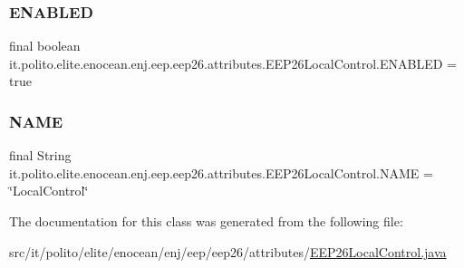 \subsubsection{\texorpdfstring{E\+N\+A\+B\+L\+ED}{ENABLED}}
{\footnotesize\ttfamily final boolean it.\+polito.\+elite.\+enocean.\+enj.\+eep.\+eep26.\+attributes.\+E\+E\+P26\+Local\+Control.\+E\+N\+A\+B\+L\+ED = true\hspace{0.3cm}{\ttfamily [static]}}

\hypertarget{classit_1_1polito_1_1elite_1_1enocean_1_1enj_1_1eep_1_1eep26_1_1attributes_1_1_e_e_p26_local_control_ae2c0ca54768891dbc547ebeb893e53b3}{}\label{classit_1_1polito_1_1elite_1_1enocean_1_1enj_1_1eep_1_1eep26_1_1attributes_1_1_e_e_p26_local_control_ae2c0ca54768891dbc547ebeb893e53b3} 
\subsubsection{\texorpdfstring{N\+A\+ME}{NAME}}
{\footnotesize\ttfamily final String it.\+polito.\+elite.\+enocean.\+enj.\+eep.\+eep26.\+attributes.\+E\+E\+P26\+Local\+Control.\+N\+A\+ME = \char`\"{}Local\+Control\char`\"{}\hspace{0.3cm}{\ttfamily [static]}}



The documentation for this class was generated from the following file\+:\begin{DoxyCompactItemize}
\item 
src/it/polito/elite/enocean/enj/eep/eep26/attributes/\hyperlink{_e_e_p26_local_control_8java}{E\+E\+P26\+Local\+Control.\+java}\end{DoxyCompactItemize}
